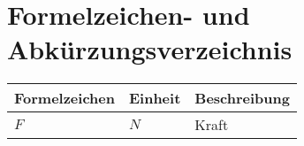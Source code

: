 \documentclass[../main.tex]{subfiles}
\begin{document}
    \section{Formelzeichen- und Abkürzungsverzeichnis}
    \begin{tabular}{lll}
        Formelzeichen & Einheit & Beschreibung
        \\
        \hline 
        $F$ & $N$ & Kraft
        
    \end{tabular}
    \newpage
\end{document}
